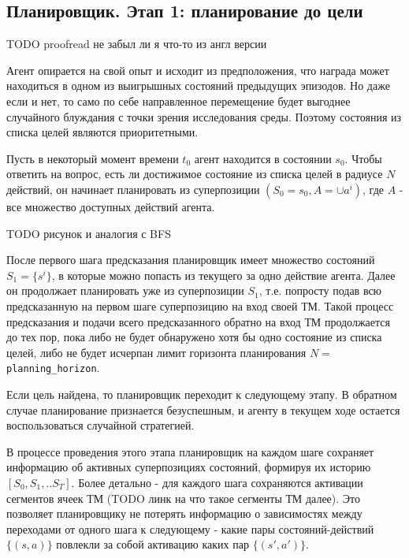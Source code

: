 \documentclass[a4paper]{article}
\begin{document}
\subsection{Планировщик. Этап 1: планирование до цели}

TODO proofread не забыл ли я что-то из англ версии

Агент опирается на свой опыт и исходит из предположения, что награда может находиться в одном из выигрышных состояний предыдущих эпизодов. Но даже если и нет, то само по себе направленное перемещение будет выгоднее случайного блуждания с точки зрения исследования среды. Поэтому состояния из списка целей являются приоритетными.

Пусть в некоторый момент времени $t_0$ агент находится в состоянии $s_0$. Чтобы ответить на вопрос, есть ли достижимое состояние из списка целей в радиусе $N$ действий, он начинает планировать из суперпозиции $(S_0 = s_0, A = \cup a^i)$, где $A$ - все множество доступных действий агента.

TODO рисунок и аналогия с BFS

После первого шага предсказания планировщик имеет множество состояний $S_1 = \{s^i\}$, в которые можно попасть из текущего за одно действие агента. Далее он продолжает планировать уже из суперпозиции $S_1$, т.е. попросту подав всю предсказанную на первом шаге суперпозицию на вход своей ТМ. Такой процесс предсказания и подачи всего предсказанного обратно на вход ТМ продолжается до тех пор, пока либо не будет обнаружено хотя бы одно состояние из списка целей, либо не будет исчерпан лимит горизонта планирования $N =$ \verb|planning_horizon|.

Если цель найдена, то планировщик переходит к следующему этапу. В обратном случае планирование признается безуспешным, и агенту в текущем ходе остается воспользоваться случайной стратегией.

В процессе проведения этого этапа планировщик на каждом шаге сохраняет информацию об активных суперпозициях состояний, формируя их историю $[S_0, S_1, .. S_T]$. Более детально - для каждого шага сохраняются активации сегментов ячеек ТМ (TODO линк на что такое сегменты ТМ далее). Это позволяет планировщику не потерять информацию о зависимостях между переходами от одного шага к следующему - какие пары состояний-действий $\{(s, a)\}$ повлекли за собой активацию каких пар $\{(s', a')\}$.
\end{document}
